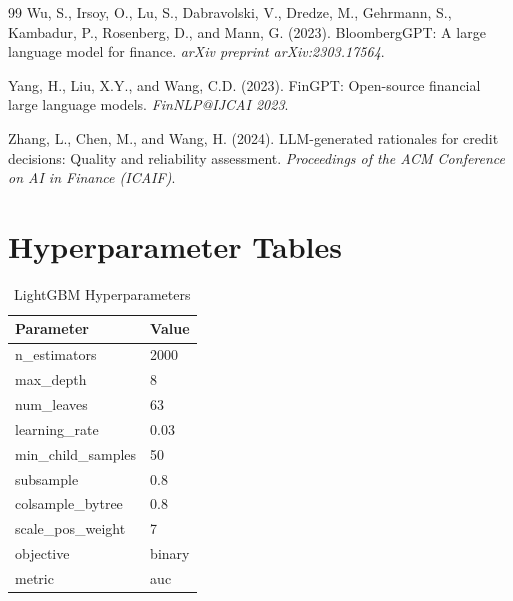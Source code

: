 \documentclass[11pt,a4paper]{article}
\begin{document}
\begin{thebibliography}{99}
Wu, S., Irsoy, O., Lu, S., Dabravolski, V., Dredze, M., Gehrmann, S., Kambadur, P., Rosenberg, D., and Mann, G. (2023).
BloombergGPT: A large language model for finance.
\emph{arXiv preprint arXiv:2303.17564}.

Yang, H., Liu, X.Y., and Wang, C.D. (2023).
FinGPT: Open-source financial large language models.
\emph{FinNLP@IJCAI 2023}.

Zhang, L., Chen, M., and Wang, H. (2024).
LLM-generated rationales for credit decisions: Quality and reliability assessment.
\emph{Proceedings of the ACM Conference on AI in Finance (ICAIF)}.

\end{thebibliography}

\newpage
\appendix
\section{Hyperparameter Tables}\label{app:hyperparameters}

\begin{table}[H]
\centering
\caption{LightGBM Hyperparameters}
\begin{tabular}{ll}
\toprule
\textbf{Parameter} & \textbf{Value} \\
\midrule
n\_estimators & 2000 \\
max\_depth & 8 \\
num\_leaves & 63 \\
learning\_rate & 0.03 \\
min\_child\_samples & 50 \\
subsample & 0.8 \\
colsample\_bytree & 0.8 \\
scale\_pos\_weight & 7 \\
objective & binary \\
metric & auc \\
\bottomrule
\end{tabular}
\end{table}
\end{document}
